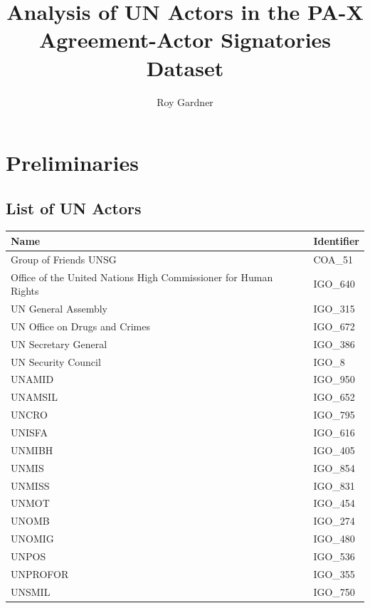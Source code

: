 \documentclass{article}
\title{Analysis of UN Actors in the PA-X Agreement-Actor Signatories Dataset}
\author{Roy Gardner}
\begin{document}

\maketitle

\tableofcontents
\newpage

\section{Preliminaries}

\subsection{List of UN Actors}

\begin{table}[H]
\begin{center}
\small
\begin{tabularx}{\textwidth}{|X|l|}
    \hline
    \textbf{Name} & \textbf{Identifier} \\
    \hline
    \hline
        Group of Friends UNSG & COA\_51 \\
	\hline
	Office of the United Nations High Commissioner for Human Rights & IGO\_640 \\
	\hline
	UN General Assembly & IGO\_315 \\
	\hline
	UN Office on Drugs and Crimes & IGO\_672 \\
	\hline
	UN Secretary General & IGO\_386 \\
	\hline
	UN Security Council & IGO\_8 \\
	\hline
	UNAMID & IGO\_950 \\
	\hline
	UNAMSIL & IGO\_652 \\
	\hline
	UNCRO & IGO\_795 \\
	\hline
	UNISFA & IGO\_616 \\
	\hline
	UNMIBH & IGO\_405 \\
	\hline
	UNMIS & IGO\_854 \\
	\hline
	UNMISS & IGO\_831 \\
	\hline
	UNMOT & IGO\_454 \\
	\hline
	UNOMB & IGO\_274 \\
	\hline
	UNOMIG & IGO\_480 \\
	\hline
	UNPOS & IGO\_536 \\
	\hline
	UNPROFOR & IGO\_355 \\
	\hline
	UNSMIL & IGO\_750 \\
	\hline

\end{tabularx}
\end{center}
\end{table}
\end{document}
